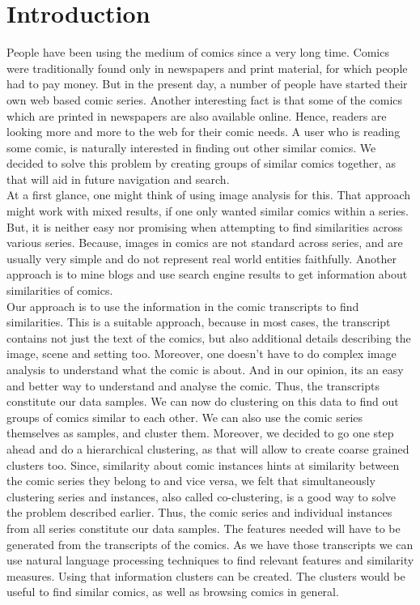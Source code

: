 \documentclass[11pt]{article}
\begin{document}
\section{Introduction}
People have been using the medium of comics since a very long time. Comics were traditionally found only in newspapers and print material, for which people had to pay money. But in the present day, a number of people have started their own web based comic series. Another interesting fact is that some of the comics which are printed in newspapers are also available online. Hence, readers are looking more and more to the web for their comic needs. A user who is reading some comic, is naturally interested in finding out other similar comics. We decided to solve this problem by creating groups of similar comics together, as that will aid in future navigation and search.\\
At a first glance, one might think of using image analysis for this. That approach might work with mixed results, if one only wanted similar comics within a series. But, it is neither easy nor promising when attempting to find similarities across various series. Because, images in comics are not standard across series, and are usually very simple and do not represent real world entities faithfully. Another approach is to mine blogs and use search engine results to get information about similarities of comics.\\
Our approach is to use the information in the comic transcripts to find similarities. This is a suitable approach, because in most cases, the transcript contains not just the text of the comics, but also additional details describing the image, scene and setting too. Moreover, one doesn't have to do complex image analysis to understand what the comic is about. And in our opinion, its an easy and better way to understand and analyse the comic. Thus, the transcripts constitute our data samples. We can now do clustering on this data to find out groups of comics similar to each other. We can also use the comic series themselves as samples, and cluster them. Moreover, we decided to go one step ahead and do a hierarchical clustering, as that will allow to create coarse grained clusters too. Since, similarity about comic instances hints at similarity between the comic series they belong to and vice versa, we felt that simultaneously clustering series and instances, also called co-clustering, is a good way to solve the problem described earlier. Thus, the comic series and individual instances from all series constitute our data samples. The features needed will have to be generated from the transcripts of the comics. As we have those transcripts we can use natural language processing techniques to find relevant features and similarity measures. Using that information clusters can be created. The clusters would be useful to find similar comics, as well as browsing comics in general.\\
\end{document}
